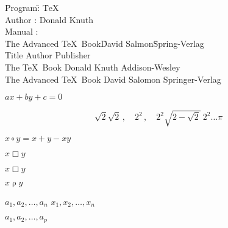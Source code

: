 \documentclass[11pt, oneside]{article}   	%
\begin{document}
\begin{tabbing}
\hspace{1cm} \= Program\quad \= : \= \TeX\\[5pt]
			\> Author                  \> : \> Donald Knuth\\[5pt]
			\> Manual                \> : \\
\hspace{1cm}\quad\= The Advanced \TeX\ Book\quad\= David Salmon\quad\= Spring-Verlag\kill\\
                                         \> \textsf{Title}                                           \> \textsf{Author}           \> \textsf{Publisher}\\[8pt]
                                         \> The \TeX\ Book                                      \> Donald Knuth             \> Addison-Wesley\\[5pt]
                                         \> The Advanced \TeX\ Book              \> David Salomon          \> Springer-Verlag
\end{tabbing}

\begin{math} ax+by+c=0 \end{math}

$$
\sqrt{2}
\sqrt{2}\, , \quad 2^2\, , \quad 2^2\sqrt{2-\sqrt{2}}\
2^2
\ldots
\pi
$$

$ x \circ y = x + y - xy $

$ x \Box y $

$ x \mathbin \Box y $

$ x \mathrel \rho y $

\newcommand{\vect}[1]{#1_1, #1_2, \dots, #1_n}
$\vect{a}$ \quad
$\vect{x}$

\newcommand{\vectTwo}[2]{#1_1, #1_2, \dots, #1_#2}
$\vectTwo{a}{p}$
\end{document}
